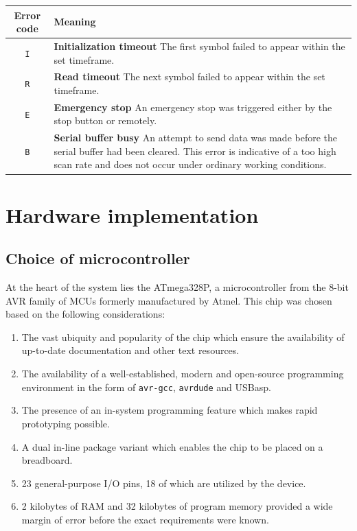 \documentclass{article}
\begin{document}
	\begin{center}
	\begin{tabular}{ |c|p{9cm}| }
		\hline
			Error code & Meaning \\
		\hline
			\texttt{I} &
			\textbf{Initialization timeout}\newline
			The first symbol failed to appear within the set timeframe. \\
		\hline
			\texttt{R} &
			\textbf{Read timeout}\newline
			The next symbol failed to appear within the set timeframe. \\
		\hline
			\texttt{E} &
			\textbf{Emergency stop}\newline
			An emergency stop was triggered either by the stop button or
			remotely. \\
		\hline
			\texttt{B} &
			\textbf{Serial buffer busy}\newline
			An attempt to send data was made before the serial buffer had been
			cleared. This error is indicative of a too high scan rate and does
			not occur under ordinary working conditions.\\
		\hline
		\end{tabular}
	\end{center}
	
	\section{Hardware implementation}
	
	\subsection{Choice of microcontroller}
	
	At the heart of the system lies the ATmega328P, a microcontroller from the
	8-bit AVR family of MCUs formerly manufactured by Atmel. This chip was
	chosen based on the following considerations:
	\begin{enumerate}
		\item The vast ubiquity and popularity of the chip which ensure the
		availability of up-to-date documentation and other text resources.
		\item The availability of a well-established, modern and open-source
		programming environment in the form of \texttt{avr-gcc},
		\texttt{avrdude} and USBasp.
		\item The presence of an in-system programming feature which makes
		rapid prototyping possible.
		\item A dual in-line package variant which enables the chip to be
		placed on a breadboard.
		\item 23 general-purpose I/O pins, 18 of which are utilized by the
		device.
		\item 2 kilobytes of RAM and 32 kilobytes of program memory provided a
		wide margin of error before the exact requirements were known.
	\end{enumerate}
	
\end{document}
